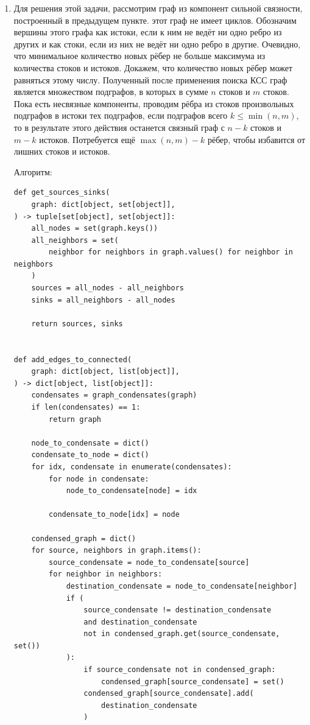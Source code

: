 \documentclass{article}
\begin{document}
\begin{enumerate}
\begin{enumerate}
		      \item Для решения этой задачи, рассмотрим граф из
		            компонент сильной связности, построенный в предыдущем пункте.
		            этот граф не имеет циклов. Обозначим вершины этого графа
		            как истоки, если к ним не ведёт ни одно ребро из других
		            и как стоки, если из них не ведёт ни одно ребро в другие.
		            Очевидно, что минимальное количество
		            новых рёбер не больше максимума из количества стоков и истоков.
		            Докажем, что количество новых рёбер может равняться этому числу.
		            Полученный после применения поиска КСС граф является множеством
		            подграфов, в которых в сумме $n$ стоков и $m$ стоков.
		            Пока есть несвязные компоненты, проводим рёбра из стоков
		            произвольных подграфов в истоки тех подграфов, если подграфов
		            всего $k \leq \min(n, m)$, то в результате этого действия
		            останется связный граф с $n-k$ стоков и $m-k$ истоков.
		            Потребуется ещё $\max(n, m) - k$ рёбер, чтобы избавится от
		            лишних стоков и истоков.

		            Алгоритм:
		            \begin{lstlisting}
def get_sources_sinks(
	graph: dict[object, set[object]],
) -> tuple[set[object], set[object]]:
	all_nodes = set(graph.keys())
	all_neighbors = set(
		neighbor for neighbors in graph.values() for neighbor in neighbors
	)
	sources = all_nodes - all_neighbors
	sinks = all_neighbors - all_nodes

	return sources, sinks


def add_edges_to_connected(
	graph: dict[object, list[object]],
) -> dict[object, list[object]]:
	condensates = graph_condensates(graph)
	if len(condensates) == 1:
		return graph

	node_to_condensate = dict()
	condensate_to_node = dict()
	for idx, condensate in enumerate(condensates):
		for node in condensate:
			node_to_condensate[node] = idx

		condensate_to_node[idx] = node

	condensed_graph = dict()
	for source, neighbors in graph.items():
		source_condensate = node_to_condensate[source]
		for neighbor in neighbors:
			destination_condensate = node_to_condensate[neighbor]
			if (
				source_condensate != destination_condensate
				and destination_condensate
				not in condensed_graph.get(source_condensate, set())
			):
				if source_condensate not in condensed_graph:
					condensed_graph[source_condensate] = set()
				condensed_graph[source_condensate].add(
					destination_condensate
				)


\end{lstlisting}
\end{enumerate}
\end{enumerate}
\end{document}
